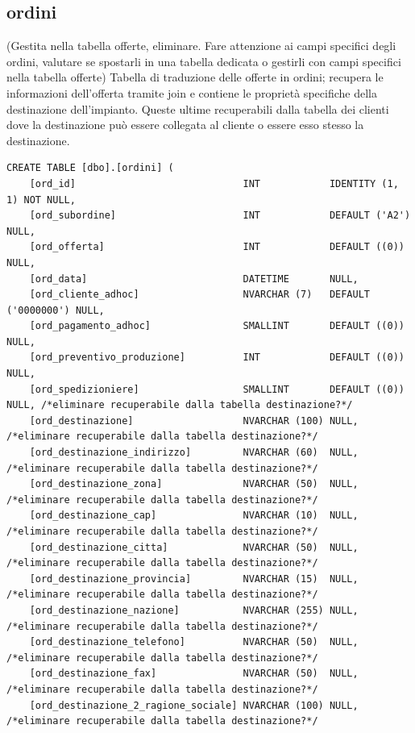 \documentclass[12pt]{article}
\begin{document}
\subsection{ordini}
(Gestita nella tabella offerte, eliminare. Fare attenzione ai campi specifici degli ordini, valutare se spostarli in una tabella dedicata o gestirli con campi specifici nella tabella offerte)
Tabella di traduzione delle offerte in ordini; recupera le informazioni dell'offerta tramite join e
contiene le proprietà specifiche della destinazione dell'impianto.
Queste ultime recuperabili dalla tabella dei clienti dove la destinazione può essere
collegata al cliente o essere esso stesso la destinazione.
\begin{lstlisting}
CREATE TABLE [dbo].[ordini] (
    [ord_id]                             INT            IDENTITY (1, 1) NOT NULL,
    [ord_subordine]                      INT            DEFAULT ('A2') NULL,
    [ord_offerta]                        INT            DEFAULT ((0)) NULL,
    [ord_data]                           DATETIME       NULL,
    [ord_cliente_adhoc]                  NVARCHAR (7)   DEFAULT ('0000000') NULL,
    [ord_pagamento_adhoc]                SMALLINT       DEFAULT ((0)) NULL,
    [ord_preventivo_produzione]          INT            DEFAULT ((0)) NULL,
    [ord_spedizioniere]                  SMALLINT       DEFAULT ((0)) NULL, /*eliminare recuperabile dalla tabella destinazione?*/
    [ord_destinazione]                   NVARCHAR (100) NULL,   /*eliminare recuperabile dalla tabella destinazione?*/
    [ord_destinazione_indirizzo]         NVARCHAR (60)  NULL,   /*eliminare recuperabile dalla tabella destinazione?*/
    [ord_destinazione_zona]              NVARCHAR (50)  NULL,   /*eliminare recuperabile dalla tabella destinazione?*/
    [ord_destinazione_cap]               NVARCHAR (10)  NULL,   /*eliminare recuperabile dalla tabella destinazione?*/
    [ord_destinazione_citta]             NVARCHAR (50)  NULL,   /*eliminare recuperabile dalla tabella destinazione?*/
    [ord_destinazione_provincia]         NVARCHAR (15)  NULL,   /*eliminare recuperabile dalla tabella destinazione?*/
    [ord_destinazione_nazione]           NVARCHAR (255) NULL,   /*eliminare recuperabile dalla tabella destinazione?*/
    [ord_destinazione_telefono]          NVARCHAR (50)  NULL,   /*eliminare recuperabile dalla tabella destinazione?*/
    [ord_destinazione_fax]               NVARCHAR (50)  NULL,   /*eliminare recuperabile dalla tabella destinazione?*/
    [ord_destinazione_2_ragione_sociale] NVARCHAR (100) NULL,   /*eliminare recuperabile dalla tabella destinazione?*/

\end{lstlisting}
\end{document}
